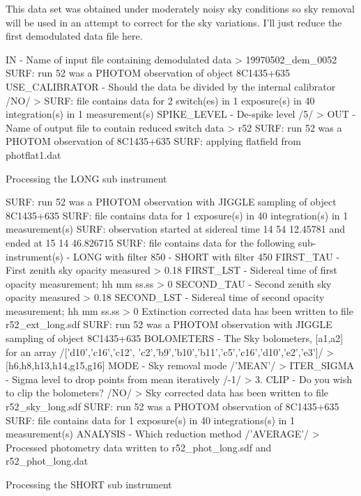 \documentclass[twoside,11pt,fleqn,noabs]{starlink}
\begin{document}
This data set was obtained under moderately noisy sky conditions so
sky removal will be used in an attempt to correct for the sky
variations. I'll just reduce the first demodulated data file here.

\begin{small}
\begin{terminalv}
IN - Name of input file containing demodulated data > 19970502_dem_0052
SURF: run 52 was a PHOTOM observation of object 8C1435+635
USE_CALIBRATOR - Should the data be divided by the internal calibrator /NO/ >
SURF: file contains data for 2 switch(es) in 1 exposure(s) in 40 integration(s)
in 1 measurement(s)
SPIKE_LEVEL - De-spike level /5/ >
OUT - Name of output file to contain reduced switch data > r52
SURF: run 52 was a PHOTOM observation of 8C1435+635
SURF: applying flatfield from photflat1.dat

Processing the LONG sub instrument

SURF: run 52 was a PHOTOM observation with JIGGLE sampling of object 8C1435+635
SURF: file contains data for 1 exposure(s) in 40 integration(s) in 1
measurement(s)
SURF: observation started at sidereal time 14 54 12.45781 and ended at 15 14
46.826715
SURF: file contains data for the following sub-instrument(s)
 - LONG with filter 850
 - SHORT with filter 450
FIRST_TAU - First zenith sky opacity measured > 0.18
FIRST_LST - Sidereal time of first opacity measurement; hh mm ss.ss > 0
SECOND_TAU - Second zenith sky opacity measured > 0.18
SECOND_LST - Sidereal time of second opacity measurement; hh mm ss.ss > 0
Extinction corrected data has been written to file r52_ext_long.sdf
SURF: run 52 was a PHOTOM observation with JIGGLE sampling of object 8C1435+635
BOLOMETERS - The Sky bolometers, [a1,a2] for an array /['d10','c16','c12',
'c2','b9','b10','b11','c5','c16','d10','e2','e3']/ > [h6,h8,h13,h14,g15,g16]
MODE - Sky removal mode /'MEAN'/ >
ITER_SIGMA - Sigma level to drop points from mean iteratively /-1/ > 3.
CLIP - Do you wish to clip the bolometers? /NO/ >
Sky corrected data has been written to file r52_sky_long.sdf
SURF: run 52 was a PHOTOM observation of 8C1435+635
SURF: file contains data for 1 exposure(s) in 40 integrations(s) in 1
measurement(s)
ANALYSIS - Which reduction method /'AVERAGE'/ >
Processed photometry data written to r52_phot_long.sdf and r52_phot_long.dat

Processing the SHORT sub instrument


\end{terminalv}
\end{small}
\end{document}
